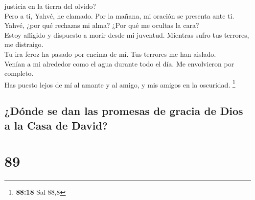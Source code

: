 justicia en la tierra del olvido?\\
 Pero a ti, Yahvé, he clamado. Por la mañana, mi oración
se presenta ante ti.\\
 Yahvé, ¿por qué rechazas mi alma? ¿Por qué me ocultas la
cara?\\
 Estoy afligido y dispuesto a morir desde mi juventud.
Mientras sufro tus terrores, me distraigo.\\
 Tu ira feroz ha pasado por encima de mí. Tus terrores me
han aislado.\\
 Venían a mi alrededor como el agua durante todo el día.
Me envolvieron por completo.\\
 Has puesto lejos de mí al amante y al amigo, y mis
amigos en la oscuridad. \footnote{\textbf{88:18} Sal 88,8}

\hypertarget{duxf3nde-se-dan-las-promesas-de-gracia-de-dios-a-la-casa-de-david}{%
\subsection{¿Dónde se dan las promesas de gracia de Dios a la Casa de
David?}\label{duxf3nde-se-dan-las-promesas-de-gracia-de-dios-a-la-casa-de-david}}

\hypertarget{section-86}{%
\section{89}\label{section-86}}

